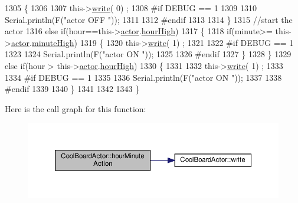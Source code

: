 \begin{DoxyCode}
1305     \{
1306 
1307         this->\hyperlink{class_cool_board_actor_a958786ff01ea1056ee72c72d439f86da}{write}( 0) ;
1308 \textcolor{preprocessor}{    #if DEBUG == 1 }
1309 
1310         Serial.println(F(\textcolor{stringliteral}{"actor OFF "}));
1311 
1312 \textcolor{preprocessor}{    #endif  }
1313     
1314     \}
1315     \textcolor{comment}{//start the actor}
1316     \textcolor{keywordflow}{else} \textcolor{keywordflow}{if}(hour==this->\hyperlink{class_cool_board_actor_a8f190db9f7a39fddbcef7f152da970e9}{actor}.\hyperlink{struct_cool_board_actor_1_1state_acd1af3ac2382258a5b05497d814adc01}{hourHigh})
1317     \{
1318         \textcolor{keywordflow}{if}(minute>= this->\hyperlink{class_cool_board_actor_a8f190db9f7a39fddbcef7f152da970e9}{actor}.\hyperlink{struct_cool_board_actor_1_1state_a4bff3d61ead74adb60be224764b93006}{minuteHigh})
1319         \{
1320             this->\hyperlink{class_cool_board_actor_a958786ff01ea1056ee72c72d439f86da}{write}( 1) ;
1321 
1322 \textcolor{preprocessor}{        #if DEBUG == 1 }
1323 
1324             Serial.println(F(\textcolor{stringliteral}{"actor ON "}));
1325 
1326 \textcolor{preprocessor}{        #endif  }
1327         \}
1328     \}
1329     \textcolor{keywordflow}{else} \textcolor{keywordflow}{if}(hour > this->\hyperlink{class_cool_board_actor_a8f190db9f7a39fddbcef7f152da970e9}{actor}.\hyperlink{struct_cool_board_actor_1_1state_acd1af3ac2382258a5b05497d814adc01}{hourHigh})
1330     \{
1331 
1332         this->\hyperlink{class_cool_board_actor_a958786ff01ea1056ee72c72d439f86da}{write}( 1) ;
1333 
1334 \textcolor{preprocessor}{    #if DEBUG == 1 }
1335 
1336         Serial.println(F(\textcolor{stringliteral}{"actor ON "}));
1337 
1338 \textcolor{preprocessor}{    #endif      }
1339 
1340     \}
1341 
1342     
1343 \}
\end{DoxyCode}
Here is the call graph for this function\+:\nopagebreak
\begin{figure}[H]
\begin{center}
\leavevmode
\includegraphics[width=350pt]{dc/d69/class_cool_board_actor_a1eb1fbca19bc80aad20d2686d52317f8_cgraph}
\end{center}
\end{figure}
